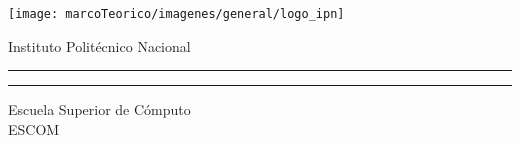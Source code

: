 
\thispagestyle{empty}
\begin{minipage}[c][0.15\textheight][c]{0.2\textwidth}
\begin{center}
    \texttt{[image: marcoTeorico/imagenes/general/logo\_ipn]}
\end{center}
\end{minipage}
\begin{minipage}[c][0.1\textheight][c]{0.65\textwidth}
\begin{center}
    {\LARGE Instituto Politécnico Nacional}
    \vspace{.3cm}
    \hrule height2.5pt
    \vspace{.1cm}
    \hrule height1pt
    \vspace{.5cm}
    {\Large Escuela Superior de Cómputo}
    \\
    \vspace{.4cm}
    {\Large ESCOM}
\end{center}
\end{minipage}

